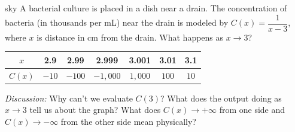 \documentclass[10pt]{article}
\begin{document}
\begin{skillbox}[Hook]{sky}
A bacterial culture is placed in a dish near a drain. The concentration of bacteria (in thousands
per mL) near the drain is modeled by $C(x) = \dfrac{1}{x - 3}$, where $x$ is distance in cm from
the drain. What happens as $x \to 3$?

\medskip
\renewcommand{\arraystretch}{1.3}
\begin{tabular}{|c|c|c|c|c|c|c|}
\hline
$x$    & 2.9 & 2.99 & 2.999 & 3.001 & 3.01 & 3.1 \\
\hline
$C(x)$ & $-10$ & $-100$ & $-1{,}000$ & $1{,}000$ & $100$ & $10$ \\
\hline
\end{tabular}

\medskip
\textit{Discussion:} Why can't we evaluate $C(3)$? What does the output doing as $x \to 3$
tell us about the graph? What does $C(x) \to +\infty$ from one side and $C(x) \to -\infty$
from the other side mean physically?
\end{skillbox}
\end{document}
